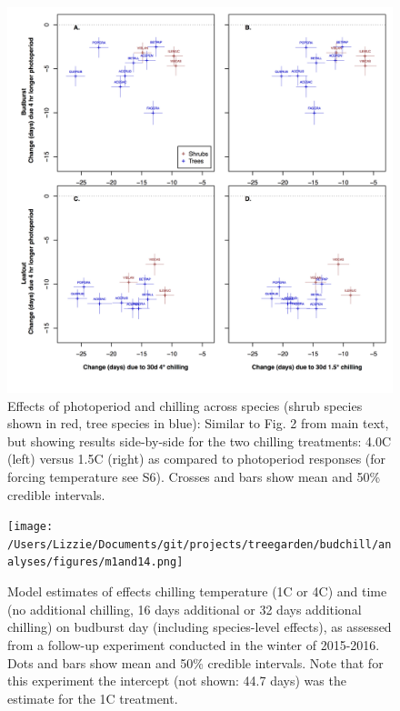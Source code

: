 \documentclass{article}
\begin{document}
\begin{figure}
\label{fig:figS7}
\includegraphics[width=1\textwidth]{FigChillPhoto_4panel.png}
\caption{Effects of photoperiod and chilling across species (shrub species shown in red, tree species in blue): Similar to Fig. 2 from main text, but showing results side-by-side for the two chilling treatments: 4.0\degree C (left) versus 1.5\degree C (right) as compared to photoperiod responses (for forcing temperature see S6). Crosses and bars show mean and 50\% credible intervals.}
\end{figure}

\begin{figure}
\texttt{[image: /Users/Lizzie/Documents/git/projects/treegarden/budchill/analyses/figures/m1and14.png]} %
\caption{Model estimates of effects chilling temperature (1\degree C or 4\degree C) and time (no additional chilling, 16 days additional or 32 days additional chilling) on budburst day (including species-level effects), as assessed from a follow-up experiment conducted in the winter of 2015-2016. Dots and bars show mean and 50\% credible intervals. Note that for this experiment the intercept (not shown: 44.7 days) was the estimate for the 1\degree C treatment.}
\label{fig:figbudchill}
\end{figure}
\end{document}
